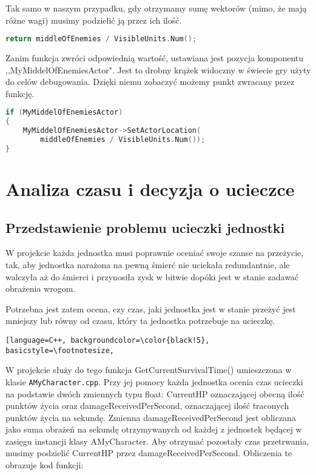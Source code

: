 \documentclass[12pt]{report}
\begin{document}
Tak samo w naszym przypadku, gdy otrzymamy sumę wektorów (mimo, że mają różne wagi) musimy podzielić ją przez ich ilość.
\begin{lstlisting}[language=C++, backgroundcolor=\color{black!5}, basicstyle=\footnotesize, caption=Wartość zwracana funkcji GetMiddleOfEnemies();]
return middleOfEnemies / VisibleUnits.Num();
\end{lstlisting}

Zanim funkcja zwróci odpowiednią wartość, ustawiana jest pozycja komponentu ,,MyMiddelOfEnemiesActor". Jest to drobny krążek widoczny w świecie gry użyty do celów debugowania. Dzięki niemu zobaczyć możemy punkt zwracany przez funkcję.

\begin{lstlisting}[language=C++, backgroundcolor=\color{black!5}, basicstyle=\footnotesize, caption=Ustawienie pozycji komponentu MyMiddelOfEnemiesActor w funkcji GetMiddleOfEnemies();]
if (MyMiddelOfEnemiesActor)
{
	MyMiddelOfEnemiesActor->SetActorLocation(
	    middleOfEnemies / VisibleUnits.Num());
}
\end{lstlisting}

\section{Analiza czasu i decyzja o ucieczce}
\subsection{Przedstawienie problemu ucieczki jednostki}
W projekcie każda jednostka musi poprawnie oceniać swoje szanse na przeżycie, tak, aby jednostka narażona na pewną śmierć nie uciekała redundantnie, ale walczyła aż do śmierci i przynosiła zysk w bitwie dopóki jest w stanie zadawać obrażenia wrogom.

Potrzebna jest zatem ocena, czy czas, jaki jednostka jest w stanie przeżyć jest mniejszy lub równy od czasu, który ta jednostka potrzebuje na ucieczkę.

\begin{lstlisting}[language=C++, backgroundcolor=\color{black!5}, basicstyle=\footnotesize, 

\end{lstlisting}


W projekcie służy do tego funkcja GetCurrentSurvivalTime() umieszczona w klasie \texttt{AMyCharacter.cpp}. Przy jej pomocy każda jednostka ocenia czas ucieczki na podstawie dwóch zmiennych typu float: CurrentHP oznaczającej obecną ilość punktów życia oraz damageReceivedPerSecond, oznaczającej ilość traconych punktów życia na sekundę. Zmienna damageReceivedPerSecond jest obliczana jako suma obrażeń na sekundę otrzymywanych od każdej z jednostek będącej w zasięgu instancji klasy AMyCharacter. Aby otrzymać pozostały czas przetrwania, musimy podzielić CurrentHP przez damageReceivedPerSecond. Obliczenia te obrazuje kod funkcji:
\end{document}
